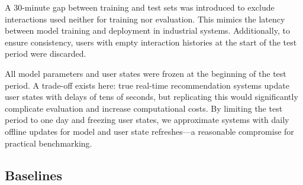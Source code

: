 \documentclass[sigconf,authorversion,nonacm]{acmart}
\begin{document}
A 30-minute gap between training and test sets was introduced to exclude interactions used neither for training nor evaluation. This mimics the latency between model training and deployment in industrial systems. Additionally, to ensure consistency, users with empty interaction histories at the start of the test period were discarded.

All model parameters and user states were frozen at the beginning of the test period. A trade-off exists here: true real-time recommendation systems update user states with delays of tens of seconds, but replicating this would significantly complicate evaluation and increase computational costs. By limiting the test period to one day and freezing user states, we approximate systems with daily offline updates for model and user state refreshes—a reasonable compromise for practical benchmarking.

\subsection{Baselines}
\end{document}
